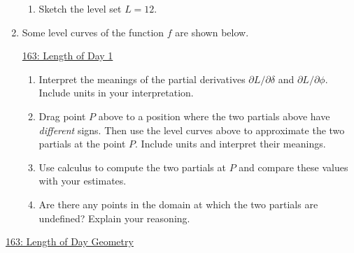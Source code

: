 \documentclass{ximera}
\begin{document}
\begin{example}
\begin{enumerate}
\begin{enumerate}
\item Sketch the level set $L=12$.  
\end{enumerate}


\item Some level curves of the function $f$ are shown below.

\begin{onlineOnly}
    \begin{center}
\end{center}
\end{onlineOnly}

\href{https://www.desmos.com/calculator/ub47uf52hj}{163: Length of Day 1}

\begin{enumerate}
\item Interpret the meanings of the partial derivatives $\partial L/\partial \delta$ and $\partial L / \partial \phi$. Include units in your interpretation.

\item Drag point $P$ above to a position where the two partials above have \emph{different} signs. Then use the level curves above to approximate the two partials at the point $P$. Include units and interpret their meanings.

\item Use calculus to compute the two partials at $P$ and compare these values with your estimates.

\item Are there any points in the domain at which the two partials are undefined? Explain your reasoning.
\end{enumerate}


\end{enumerate}
\end{example}




\begin{example}  \label{E345432565554}
\begin{onlineOnly}
    \begin{center}
\end{center}
\end{onlineOnly}

\href{https://www.desmos.com/3d/jhuok4umw3}{163: Length of Day Geometry}

\end{example}
\end{document}
